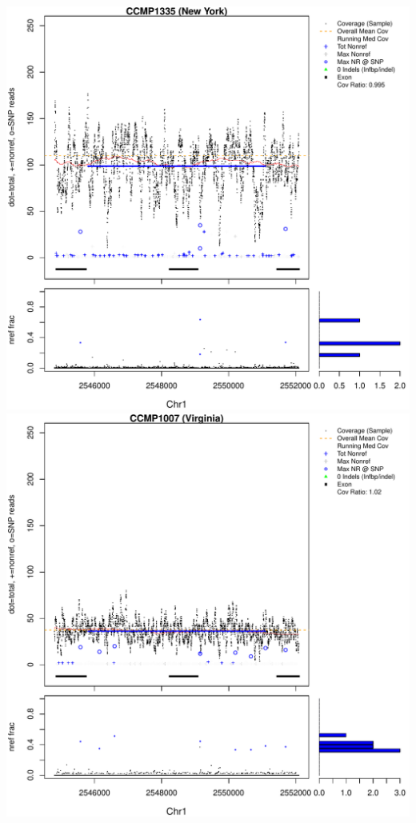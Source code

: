 \documentclass{article}\usepackage[]{graphicx}\usepackage[]{color}
\makeatletter
\def\maxwidth{ %
  \ifdim\Gin@nat@width>\linewidth
    \linewidth
  \else
    \Gin@nat@width
  \fi
}
\newenvironment{knitrout}{}{} %
\makeatother
\begin{document}
\begin{knitrout}
{\centering \includegraphics[width=\maxwidth]{figs-knitr/unnamed-chunk-49-1} 
\includegraphics[width=\maxwidth]{figs-knitr/unnamed-chunk-49-2} 
}
\end{knitrout}
\end{document}
